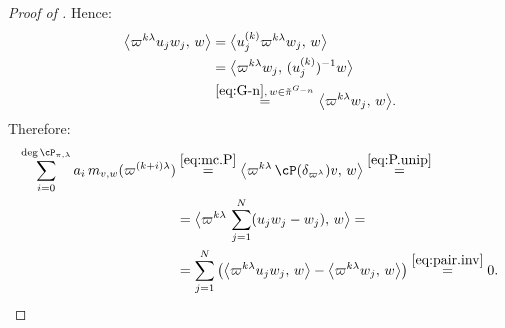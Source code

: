 \documentclass[12pt,a4paper]{amsart}%
\newcommand{\RamiA}[1]{{{#1}}}
\begin{document}
\begin{proof}[Proof of ]
Hence:%
\RamiA{
\begin{equation}\label{eq:pair.inv}
\begin{split}
\big\langle \varpi^{k\lambda} u_j w_j,\,w\big\rangle
&=\big\langle u_j^{(k)}  \varpi^{k\lambda} w_j,\,w\big\rangle\\
&=\big\langle \varpi^{k\lambda} w_j,\,(u_j^{(k)})^{-1} w\big\rangle\\
&\overset{\eqref{eq:G-n},\, w\in\tilde\pi^{G_{-n}}}{=}\big\langle \varpi^{k\lambda} w_j,\,w\big\rangle.
\end{split}
\end{equation}
}
\RamiA{Therefore:
\begin{align*}
\sum_{i=0}^{\deg\cP_{\pi,\lambda}}a_i\,m_{v,w}(\varpi^{(k+i)\lambda})
&\overset{\eqref{eq:mc.P}}{=}\big\langle \varpi^{k\lambda}\,\cP(\delta_{\varpi^\lambda})v,\,w\big\rangle
\overset{\eqref{eq:P.unip}}{=}\\
&=\big\langle \varpi^{k\lambda}\,\sum_{j=1}^{N}(u_jw_j-w_j),\,w\big\rangle=\\
&=\sum_{j=1}^N\left(\big\langle \varpi^{k\lambda}  u_j w_j,\,w\big\rangle-
\big\langle \varpi^{k\lambda}   w_j,\,w\big\rangle\right)
\overset{\eqref{eq:pair.inv}}{=}0.
\end{align*}
}

\end{proof}
\end{document}
